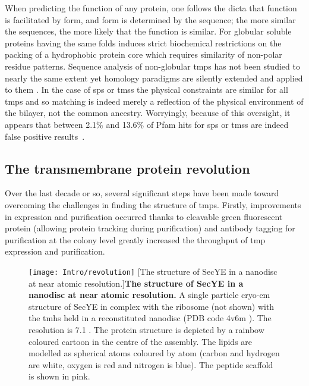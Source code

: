 When predicting the function of any protein, one follows the dicta that function is facilitated by form, and form is determined by the sequence; the more similar the sequences, the more likely that the function is similar.
For globular soluble proteins having the same folds induces strict biochemical restrictions on the packing of a hydrophobic protein core which requires similarity of non-polar residue patterns.
Sequence analysis of non-globular \gls{tmp}s has not been studied to nearly the same extent yet homology paradigms are silently extended and applied to them \cite{Wong2010}.
In the case of \gls{sp}s or \gls{tms}s the physical constraints are similar for all \gls{tmp}s and so matching is indeed merely a reflection of the physical environment of the bilayer, not the common ancestry.
Worryingly, because of this oversight, it appears that between 2.1\% and 13.6\% of Pfam hits for \gls{sp}s or \gls{tms}s are indeed false positive results~\cite{Wong2010}.

\subsection{The transmembrane protein revolution}\label{section:revolution}
Over the last decade or so, several significant steps have been made toward overcoming the challenges in finding the structure of \gls{tmp}s.
Firstly, improvements in expression and purification occurred thanks to cleavable green fluorescent protein (allowing protein tracking during purification) \cite{Drew2005, Kawate2006} and antibody tagging for purification \cite{Eshaghi2005} at the colony level \cite{Cornvik2005} greatly increased the throughput of \gls{tmp} expression and purification.

\begin{figure}[ht!]
\centering
\texttt{[image: Intro/revolution]}
		[The structure of SecYE in a nanodisc at near atomic resolution.]{\textbf{The structure of SecYE in a nanodisc at near atomic resolution.}
		A single particle cryo\--\gls{em} structure of SecYE in complex with the ribosome (not shown) with the \gls{tmh}s held in a reconstituted nanodisc (PDB code 4v6m \cite{Frauenfeld2011}).
		The resolution is 7.1 \angstrom.
		The protein structure is depicted by a rainbow coloured cartoon in the centre of the assembly.
		The lipids are modelled as spherical atoms coloured by atom (carbon and hydrogen are white, oxygen is red and nitrogen is blue).
		The peptide scaffold is shown in pink.
		}

\label{fig:revolution}
\end{figure}

